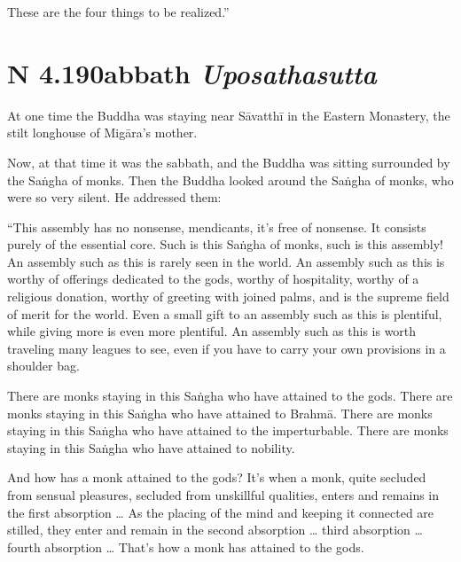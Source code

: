 \documentclass[12pt,openany]{book}%
\newcommand*{\suttatitleacronym}[1]{\smaller[2]{#1}\vspace*{.3em}}
\newcommand*{\suttatitletranslation}[1]{\linebreak{#1}}
\newcommand*{\suttatitleroot}[1]{\linebreak\smaller[2]\itshape{#1}}
\newcommand*{\tocacronym}[1]{\hspace*{-3.3em}{#1}\quad}
\newcommand*{\toctranslation}[1]{#1}
\newcommand*{\tocroot}[1]{(\textit{#1})}
\begin{document}
These are the four things to be realized.” 

%
\section*{{\suttatitleacronym AN 4.190}{\suttatitletranslation Sabbath }{\suttatitleroot Uposathasutta}}
\addcontentsline{toc}{section}{\tocacronym{AN 4.190} \toctranslation{Sabbath } \tocroot{Uposathasutta}}

At one time the Buddha was staying near \textsanskrit{Sāvatthī} in the Eastern Monastery, the stilt longhouse of \textsanskrit{Migāra}’s mother. 

Now, at that time it was the sabbath, and the Buddha was sitting surrounded by the \textsanskrit{Saṅgha} of monks. Then the Buddha looked around the \textsanskrit{Saṅgha} of monks, who were so very silent. He addressed them: 

“This assembly has no nonsense, mendicants, it’s free of nonsense. It consists purely of the essential core. Such is this \textsanskrit{Saṅgha} of monks, such is this assembly! An assembly such as this is rarely seen in the world. An assembly such as this is worthy of offerings dedicated to the gods, worthy of hospitality, worthy of a religious donation, worthy of greeting with joined palms, and is the supreme field of merit for the world. Even a small gift to an assembly such as this is plentiful, while giving more is even more plentiful. An assembly such as this is worth traveling many leagues to see, even if you have to carry your own provisions in a shoulder bag. 

There are monks staying in this \textsanskrit{Saṅgha} who have attained to the gods. There are monks staying in this \textsanskrit{Saṅgha} who have attained to \textsanskrit{Brahmā}. There are monks staying in this \textsanskrit{Saṅgha} who have attained to the imperturbable. There are monks staying in this \textsanskrit{Saṅgha} who have attained to nobility. 

And how has a monk attained to the gods? It’s when a monk, quite secluded from sensual pleasures, secluded from unskillful qualities, enters and remains in the first absorption … As the placing of the mind and keeping it connected are stilled, they enter and remain in the second absorption … third absorption … fourth absorption … That’s how a monk has attained to the gods. 
\end{document}
